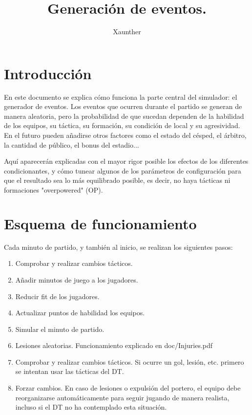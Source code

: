 \documentclass[a4paper,9pt]{article}
\title{Generaci\'on de eventos.}
\author{Xaunther}
\begin{document}
\maketitle

\section{Introducci\'on}
En este documento se explica c\'omo funciona la parte central del simulador: el generador de eventos. Los eventos que ocurren durante el partido se generan de manera aleatoria, pero la probabilidad de que sucedan dependen de la habilidad de los equipos, su t\'actica, su formaci\'on, su condici\'on de local y su agresividad. En el futuro pueden añadirse otros factores como el estado del c\'esped, el \'arbitro, la cantidad de p\'ublico, el bonus del estadio...

Aqu\'i aparecer\'an explicadas con el mayor rigor posible los efectos de los diferentes condicionantes, y c\'omo tunear algunos de los par\'ametros de configuraci\'on para que el resultado sea lo m\'as equilibrado posible, es decir, no haya t\'acticas ni formaciones "overpowered" (OP).

\section{Esquema de funcionamiento}
Cada minuto de partido, y tambi\'en al inicio, se realizan los siguientes pasos:
\begin{enumerate}
\item Comprobar y realizar cambios t\'acticos.
\item Añadir minutos de juego a los jugadores.
\item Reducir fit de los jugadores.
\item Actualizar puntos de habilidad los equipos.
\item Simular el minuto de partido.
\item Lesiones aleatorias. Funcionamiento explicado en doc/Injuries.pdf
\item Comprobar y realizar cambios t\'acticos. Si ocurre un gol, lesi\'on, etc. primero se intentan usar las t\'acticas del DT.
\item Forzar cambios. En caso de lesiones o expulsi\'on del portero, el equipo debe reorganizarse autom\'aticamente para seguir jugando de manera realista, incluso si el DT no ha contemplado esta situaci\'on.
\end{enumerate}
\end{document}
